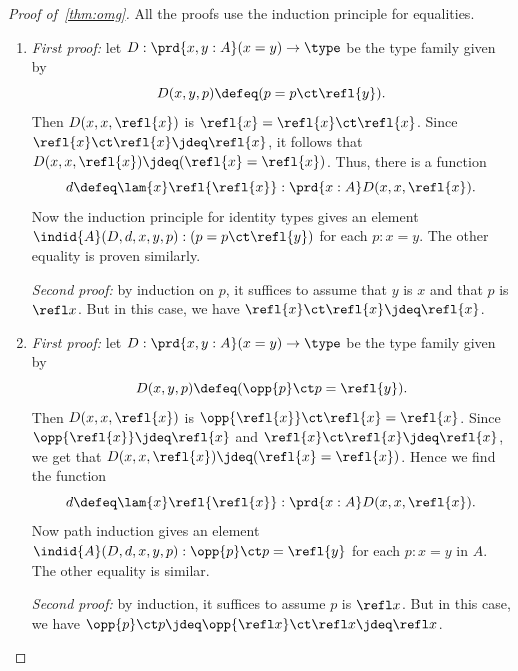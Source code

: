 \begin{proof}[Proof of~\cref{thm:omg}]
  All the proofs use the induction principle for equalities.
  \begin{enumerate}
  \item \emph{First proof:} let $D:\prd{x,y:A} (x=y) \to \type$ be the type family given by
    \begin{equation*}
      D(x,y,p)\defeq (p= p\ct \refl{y}).
    \end{equation*}
    Then $D(x,x,\refl{x})$ is $\refl{x}=\refl{x}\ct\refl{x}$.
    Since $\refl{x}\ct\refl{x}\jdeq\refl{x}$, it follows that $D(x,x,\refl{x})\jdeq (\refl{x}=\refl{x})$.
    Thus, there is a function
    \begin{equation*}
      d\defeq\lam{x} \refl{\refl{x}}:\prd{x:A} D(x,x,\refl{x}).
    \end{equation*}
    Now the induction principle for identity types gives an element $\indid{A}(D,d,x,y,p):(p= p\ct\refl{y})$ for each $p:x= y$.
    The other equality is proven similarly.

    \mentalpause

    \noindent
    \emph{Second proof:} by induction on $p$, it suffices to assume that $y$ is $x$ and that $p$ is $\refl x$.
    But in this case, we have $\refl{x}\ct\refl{x}\jdeq\refl{x}$.
  \item \emph{First proof:} let $D:\prd{x,y:A} (x=y) \to \type$ be the type family given by
    \begin{equation*}
      D(x,y,p)\defeq (\opp{p}\ct p=  \refl{y}).
    \end{equation*}
    Then $D(x,x,\refl{x})$ is $\opp{\refl{x}}\ct\refl{x}=\refl{x}$.
    Since $\opp{\refl{x}}\jdeq\refl{x}$ and $\refl{x}\ct\refl{x}\jdeq\refl{x}$, we get that $D(x,x,\refl{x})\jdeq (\refl{x}=\refl{x})$.
    Hence we find the function
    \begin{equation*}
      d\defeq\lam{x} \refl{\refl{x}}:\prd{x:A} D(x,x,\refl{x}).
    \end{equation*}
    Now path induction gives an element $\indid{A}(D,d,x,y,p):\opp{p}\ct p=\refl{y}$ for each $p:x= y$ in $A$.
    The other equality is similar.

    \mentalpause

    \noindent \emph{Second proof:} by induction, it suffices to assume $p$ is $\refl x$.
    But in this case, we have $\opp{p} \ct p \jdeq \opp{\refl x} \ct \refl x \jdeq \refl x$.


\end{enumerate}
\end{proof}
